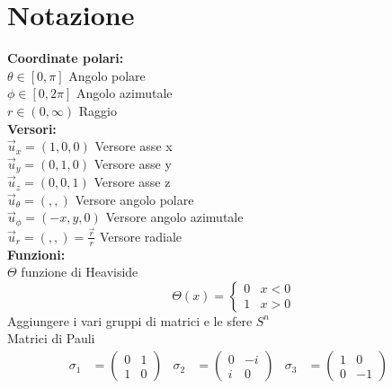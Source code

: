 \chapter{Notazione}
%
\textbf{Coordinate polari:}\\
 $\theta \in[0,\pi]$ Angolo polare\\
 $\phi \in [0,2\pi]$ Angolo azimutale\\
 $r \in (0,\infty)$ Raggio\\

\textbf{Versori:}\\
$\vec u_x = (1,0,0)$ Versore asse x \\
$\vec u_y = (0,1,0)$ Versore asse y \\
$\vec u_z = (0,0,1)$ Versore asse z \\

$\vec u _\theta = (,,)$ Versore angolo polare \\
$\vec u _\phi = (-x,y,0)$ Versore angolo azimutale \\
$\vec u _r = (,,) = \frac{\vec r}{r}$ Versore radiale \\


\textbf{Funzioni:}\\
$\Theta$ funzione di Heaviside
$$
    \Theta(x) = \begin{cases}
       0 & x < 0\\
       1 & x > 0
    \end{cases}
$$
Aggiungere i vari gruppi di matrici e le sfere $S^n$\\
Matrici di Pauli
\begin{equation}\label{eq:paulimatrix}
   \begin{aligned}
      \sigma_1 &= \begin{pmatrix} 0 & 1  \\ 1 & 0  \end{pmatrix}&
      \sigma_2 &= \begin{pmatrix} 0 & -i \\ i & 0  \end{pmatrix}&
      \sigma_3 &= \begin{pmatrix} 1 & 0  \\ 0 & -1 \end{pmatrix}&
   \end{aligned}
\end{equation}
